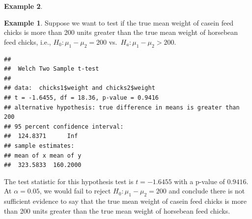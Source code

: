 \documentclass[
  11pt,
  oneside]{book}
\newenvironment{Shaded}{\begin{snugshade}}{\end{snugshade}}
\newcommand{\AttributeTok}[1]{\textcolor[rgb]{0.13,0.29,0.53}{#1}}
\newcommand{\DecValTok}[1]{\textcolor[rgb]{0.00,0.00,0.81}{#1}}
\newcommand{\FunctionTok}[1]{\textcolor[rgb]{0.13,0.29,0.53}{\textbf{#1}}}
\newcommand{\NormalTok}[1]{#1}
\newcommand{\SpecialCharTok}[1]{\textcolor[rgb]{0.81,0.36,0.00}{\textbf{#1}}}
\newcommand{\StringTok}[1]{\textcolor[rgb]{0.31,0.60,0.02}{#1}}
\theoremstyle{definition}
\theoremstyle{definition}
\newtheorem{example}{Example}[chapter]
\theoremstyle{definition}
\theoremstyle{definition}
\theoremstyle{remark}
\begin{document}
\begin{example}
\newpage

\begin{example}
Suppose we want to test if the true mean weight of casein feed chicks is more than 200 units greater than the true mean weight of horsebean feed chicks, i.e., \(H_0: \mu_1 - \mu_2 = 200\) vs.~\(H_a: \mu_1 - \mu_2 > 200\).
\end{example}

\begin{Shaded}
\end{Shaded}

\begin{verbatim}
## 
##  Welch Two Sample t-test
## 
## data:  chicks1$weight and chicks2$weight
## t = -1.6455, df = 18.36, p-value = 0.9416
## alternative hypothesis: true difference in means is greater than 200
## 95 percent confidence interval:
##  124.8371      Inf
## sample estimates:
## mean of x mean of y 
##  323.5833  160.2000
\end{verbatim}

The test statistic for this hypothesis test is \(t=-1.6455\) with a p-value of \(0.9416\). At \(\alpha=0.05\), we would fail to reject \(H_0: \mu_1 - \mu_2 = 200\) and conclude there is not sufficient evidence to say that the true mean weight of casein feed chicks is more than 200 units greater than the true mean weight of horsebean feed chicks.

\end{example}

  
\end{document}
